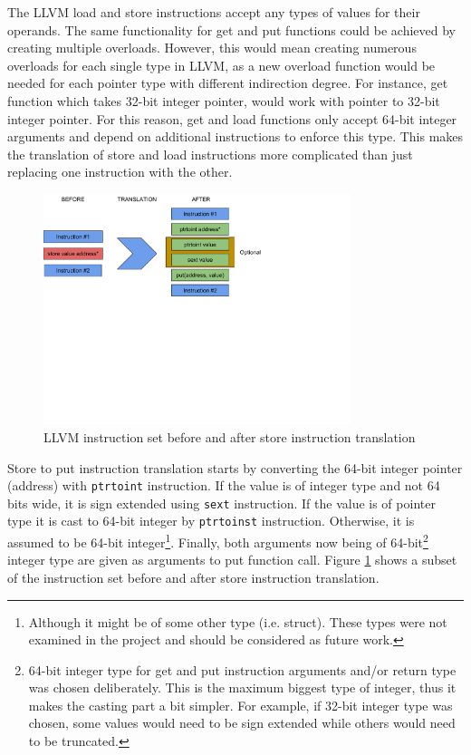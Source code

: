 \documentclass[bsc,frontabs,twoside,singlespacing,parskip,deptreport]{infthesis}     %
\begin{document}
The LLVM load and store instructions accept any types of values for their operands. The same functionality for get and put functions could be achieved by creating multiple overloads. However, this would mean creating numerous overloads for each single type in LLVM, as a new overload function would be needed for each pointer type with different indirection degree. For instance, get function which takes 32-bit integer pointer, would work with pointer to 32-bit integer pointer. For this reason, get and load functions only accept 64-bit integer arguments and depend on additional instructions to enforce this type. This makes the translation of store and load instructions more complicated than just replacing one instruction with the other.

\begin{figure}[H]
\centering
\includegraphics[width=0.8\textwidth]{images/store_translation}
\caption{LLVM instruction set before and after store instruction translation}
\label{fig:store_translation}
\end{figure}

Store to put instruction translation starts by converting the 64-bit integer pointer (address) with \texttt{ptrtoint} instruction. If the value is of integer type and not 64 bits wide, it is sign extended using \texttt{sext} instruction. If the value is of pointer type it is cast to 64-bit integer by \texttt{ptrtoinst} instruction. Otherwise, it is assumed to be 64-bit integer\footnote{Although it might be of some other type (i.e. struct). These types were not examined in the project and should be considered as future work.}. Finally, both arguments now being of 64-bit\footnote{64-bit integer type for get and put instruction arguments and/or return type was chosen deliberately. This is the maximum biggest type of integer, thus it makes the casting part a bit simpler. For example, if 32-bit integer type was chosen, some values would need to be sign extended while others would need to be truncated.} integer type are given as arguments to put function call. Figure \ref{fig:store_translation} shows a subset of the instruction set before and after store instruction translation.
\end{document}
